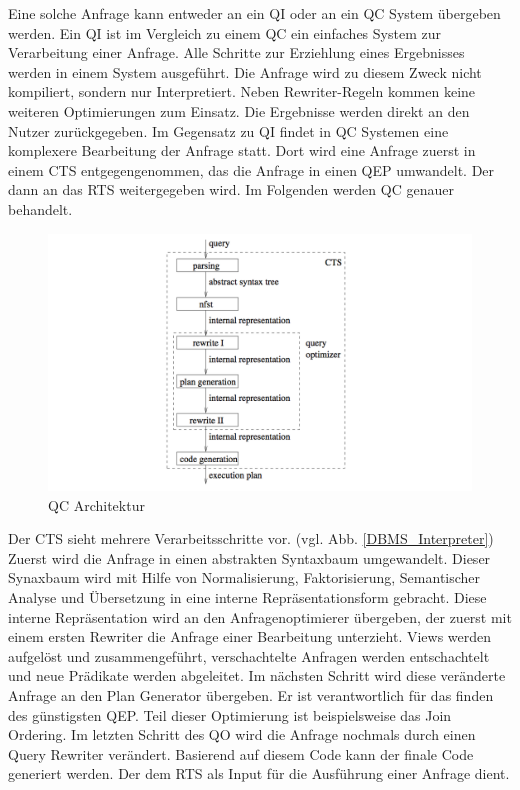 Eine solche Anfrage kann entweder an ein \ac{QI} oder an ein \ac{QC} System übergeben werden. Ein \ac{QI} ist im Vergleich zu einem \ac{QC} ein einfaches System zur Verarbeitung einer Anfrage. Alle Schritte zur Erziehlung eines Ergebnisses werden in einem System ausgeführt. Die Anfrage wird zu diesem Zweck nicht kompiliert, sondern nur Interpretiert. Neben Rewriter-Regeln kommen keine weiteren Optimierungen zum Einsatz. Die Ergebnisse werden direkt an den Nutzer zurückgegeben. Im Gegensatz zu \ac{QI} findet in \ac{QC} Systemen eine komplexere Bearbeitung der Anfrage statt. Dort wird eine Anfrage zuerst in einem \ac{CTS} entgegengenommen, das die Anfrage in einen \ac{QEP} umwandelt. Der dann an das \ac{RTS} weitergegeben wird. Im Folgenden werden \ac{QC} genauer behandelt.





\begin{figure}[h]
  \centering
  \includegraphics[width=\textwidth]{02_Grundlagen/QC_Architecture.png}
  \caption{\ac{QC} Architektur}
  \label{QC_Architecture}
\end{figure}


Der \ac{CTS} sieht mehrere Verarbeitsschritte vor. (vgl. Abb. \ref{DBMS_Interpreter}) Zuerst wird die Anfrage in einen abstrakten Syntaxbaum umgewandelt. Dieser Synaxbaum wird mit Hilfe von Normalisierung, Faktorisierung, Semantischer Analyse und Übersetzung in eine interne Repräsentationsform gebracht. Diese interne Repräsentation wird an den Anfragenoptimierer übergeben, der zuerst mit einem ersten Rewriter die Anfrage einer Bearbeitung unterzieht. Views werden aufgelöst und zusammengeführt, verschachtelte Anfragen werden entschachtelt und neue Prädikate werden abgeleitet. Im nächsten Schritt wird diese veränderte Anfrage an den Plan Generator übergeben. Er ist verantwortlich für das finden des günstigsten \ac{QEP}. Teil dieser Optimierung ist beispielsweise das Join Ordering. Im letzten Schritt des \ac{QO} wird die Anfrage nochmals durch einen Query Rewriter verändert. Basierend auf diesem Code kann der finale Code generiert werden. Der dem \ac{RTS} als Input für die Ausführung einer Anfrage dient.


